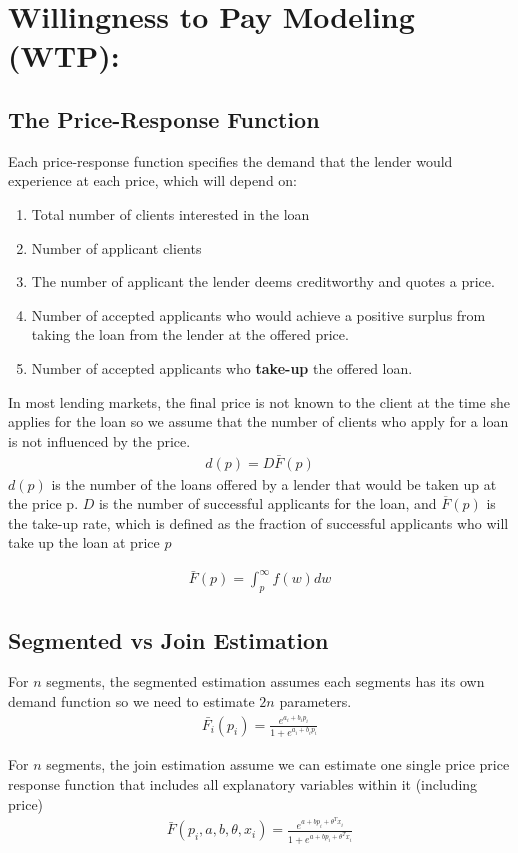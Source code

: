 
\chapter{Willingness to Pay Modeling (WTP): }
\section{The Price-Response Function}
Each price-response function specifies the demand that the lender would experience at each price, which will depend on:
\begin{enumerate}
    \item Total number of clients interested in the loan
    \item Number of applicant clients
    \item The number of applicant the lender deems creditworthy and quotes a price.
    \item Number of accepted applicants who would achieve a positive surplus from taking the loan from the lender at the offered price.
    \item Number of accepted applicants who \textbf{take-up} the offered loan.
\end{enumerate}
In most lending markets, the final price is not known to the client at the time she applies for the loan so we assume that the number of clients who apply for a loan is not influenced by the price.
\begin{align}
d(p)=D\bar{F}(p) \label{eq:demand}
\end{align}
$d(p)$ is the number of the loans offered by a lender that would be taken up at the price p. $D$ is the number of successful applicants for the loan, and $\overline{F}(p)$ is the take-up rate, which is defined as the fraction of successful applicants who will take up the loan at price $p$

\begin{align}
\bar{F}(p)=\int^\infty_p f(w)dw
\end{align}
\section{Segmented vs Join Estimation \label{sec:takeuprate}}
For $n$ segments, the segmented estimation assumes each segments has its own demand function so we need to estimate $2n$ parameters.
\begin{align}
\bar{F_i}(p_i)=\frac{e^{a_i+b_i p_i}}{1+e^{a_i+b_i p_i}}
\end{align}

For $n$ segments, the join estimation assume we can estimate one single price price response function that includes all explanatory variables within it (including price)
\begin{align}
\bar{F}(p_i,a,b,\theta,x_i)=\frac{e^{a+b p_i+\theta^T x_i}}{1+e^{a+b p_i+\theta^T x_i}}
\end{align}